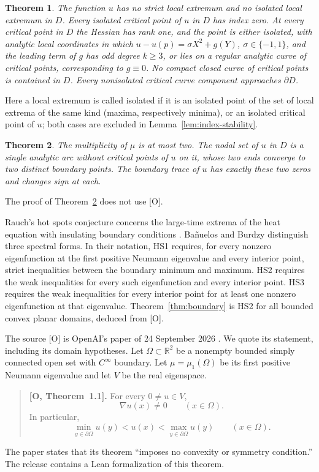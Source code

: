 \documentclass[11pt]{article}
\newtheorem{theorem}{Theorem}[section]
\theoremstyle{definition}
\newcommand{\R}{\mathbb R}
\theoremstyle{remark}
\numberwithin{equation}{section}
\begin{document}
\begin{theorem}\label{thm:critical}
The function $u$ has no strict local extremum and no isolated local extremum in $D$. Every isolated critical
point of $u$ in $D$ has index zero. At every critical point in $D$ the Hessian has rank one, and the point is
either isolated, with analytic local coordinates in which
$u-u(p)=\sigma X^2+g(Y)$, $\sigma\in\{-1,1\}$, and the leading term of $g$ has odd degree $k\ge3$, or lies on a
regular analytic curve of critical points, corresponding to $g\equiv0$. No compact closed curve of critical
points is contained in $D$. Every nonisolated critical curve component approaches $\partial D$.
\end{theorem}

Here a local extremum is called isolated if it is an isolated point of the set of local extrema of the same kind (maxima, respectively minima), or an isolated critical point of $u$; both cases are excluded in Lemma~\ref{lem:index-stability}.

\begin{theorem}\label{thm:nodal}
The multiplicity of $\mu$ is at most two. The nodal set of $u$ in $D$ is a single analytic arc without
critical points of $u$ on it, whose two ends converge to two distinct boundary points. The boundary trace of
$u$ has exactly these two zeros and changes sign at each.
\end{theorem}
The proof of Theorem~\ref{thm:nodal} does not use [O].

Rauch's hot spots conjecture concerns the large-time extrema of the heat equation with insulating boundary
conditions \cite{Rauch}. Ba\~nuelos and Burdzy \cite[Section~1]{BB1999} distinguish three spectral forms.
In their notation, HS1 requires, for every nonzero eigenfunction at the first positive Neumann eigenvalue
and every interior point, strict inequalities between the boundary minimum and maximum. HS2 requires the
weak inequalities for every such eigenfunction and every interior point. HS3 requires the weak inequalities
for every interior point for at least one nonzero eigenfunction at that eigenvalue. Theorem~\ref{thm:boundary}
is HS2 for all bounded convex planar domains, deduced from [O].

The source [O] is OpenAI's paper of 24 September 2026 \cite{OpenAI369}. We quote its statement, including its
domain hypotheses. Let $\Omega\subset\R^2$ be a nonempty bounded simply connected open set with $C^\infty$
boundary. Let $\mu=\mu_1(\Omega)$ be its first positive Neumann eigenvalue and let $V$ be the real eigenspace.
\begin{quote}
\label{thm:source}
\textbf{[O, Theorem~1.1].} For every $0\ne u\in V$,
\begin{equation}\label{eq:source-gradient}
\nabla u(x)\ne0\qquad(x\in\Omega).
\end{equation}
In particular,
\begin{equation}\label{eq:source-strict}
\min_{y\in\partial\Omega}u(y)<u(x)<\max_{y\in\partial\Omega}u(y)
\qquad(x\in\Omega).
\end{equation}
\end{quote}
The paper states that its theorem ``imposes no convexity or symmetry condition.'' The release contains a
Lean formalization of this theorem.
\end{document}
